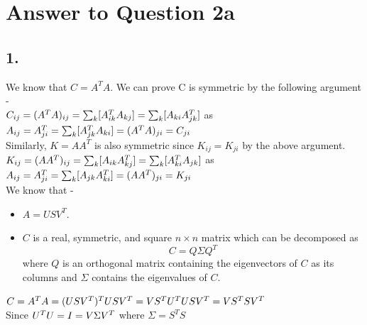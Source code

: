 \documentclass[11pt]{article}
\begin{document}
{\pagebreak[4]
\section*{Answer to Question 2a}

\subsection*{1.}
We know that $C =A^TA$. We can prove C is symmetric by the following argument - \\

$C_{ij} = (A^T  A)_{ij} \\
= \sum_k [ A^T_{ik}  A_{kj} ] \\
= \sum_k [ A_{ki}  A^T_{jk} ]$ as $A_{ij} = A^T_{ji} \\
= \sum_k [ A^T_{jk}  A_{ki} ] \\
= (A^T  A)_{ji}\\
= C_{ji}$ \\

Similarly, $K = AA^T$ is also symmetric since $K_{ij} = K_{ji}$ by the above argument.\\

$K_{ij} = (A  A^T)_{ij} \\
= \sum_k [ A_{ik}  A^T_{kj} ] \\
= \sum_k [ A^T_{ki}  A_{jk} ]$ as $A_{ij} = A^T_{ji} \\
= \sum_k [ A_{jk}  A^T_{ki} ] \\
= (A  A^T)_{ji}\\
= K_{ji}$ \\

We know that -
\begin{itemize}
\item $A = USV^T$.
\item $C$ is a real, symmetric, and square $n \times n$ matrix which can be decomposed as 
\begin{equation}
C=Q \Sigma Q^T
\end{equation}	
where  $Q$ is an orthogonal matrix containing the eigenvectors of $C$ as its columns and $\Sigma$ contains the eigenvalues of $C$.\\
\end{itemize} 
$C = A^T A = (USV^T)^TUSV^T \\
= V S^T U^T U S V^T  \\
= V S^T S V^T  \hspace{30 mm}$ Since $U^T U = I\\
= V \Sigma V^T$ \hspace{30 mm} where $\Sigma = S^T S$\\

}
\end{document}
